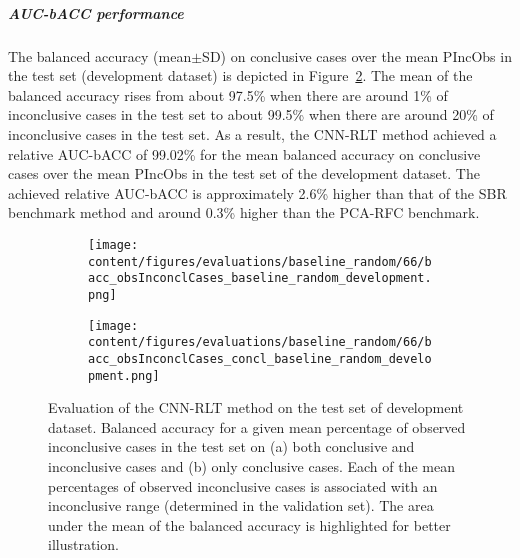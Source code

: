 \subparagraph{AUC-bACC performance}

The balanced accuracy (mean$\pm$SD) on conclusive cases over the mean PIncObs in the test set (development dataset) 
is depicted in Figure~\ref{fig:bacc_obsInconclCases_concl_baseline_random_development}.
The mean of the balanced accuracy rises from about 97.5\% 
when there are around 1\% of inconclusive cases in the test set to about 99.5\% 
when there are around 20\% of inconclusive cases in the test set.
As a result, the CNN-RLT method achieved a relative AUC-bACC of 99.02\% for the mean balanced accuracy on conclusive cases
over the mean PIncObs in the test set of the development dataset.
The achieved relative AUC-bACC is approximately 2.6\% higher than that of the SBR benchmark method 
and around 0.3\% higher than the PCA-RFC benchmark.


\begin{figure}[ht]
  \begin{subfigure}{0.5\textwidth}
    \centering
    \texttt{[image: content/figures/evaluations/baseline\_random/66/bacc\_obsInconclCases\_baseline\_random\_development.png]}
    \subcaption{}
    \label{fig:bacc_obsInconclCases_baseline_random_development}
  \end{subfigure}
  \hfill
  \begin{subfigure}{0.5\textwidth}
    \centering
    \texttt{[image: content/figures/evaluations/baseline\_random/66/bacc\_obsInconclCases\_concl\_baseline\_random\_development.png]}
    \subcaption{}
    \label{fig:bacc_obsInconclCases_concl_baseline_random_development}
  \end{subfigure}

  \caption{Evaluation of the CNN-RLT method on the test set of development dataset.
  Balanced accuracy for a given mean percentage of observed inconclusive cases in the test set on 
  (a) both conclusive and inconclusive cases and (b) only conclusive cases. 
  Each of the mean percentages of observed inconclusive cases is associated with an inconclusive range (determined in the validation set). 
  The area under the mean of the balanced accuracy is highlighted for better illustration.}
  \label{fig:bacc_obsInconclCases_baseline_random_development_full}
\end{figure}



